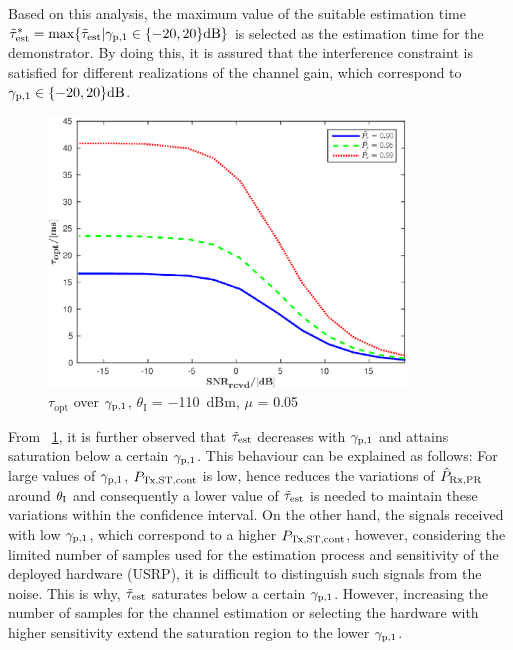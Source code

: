 Based on this analysis, the maximum value of the suitable estimation time $\tilde{\tau}^*_{\text{est}} = \operatorname*{max}\{ \tilde{\tau}_{\text{est}} | {\gamma}_{\text{p,1}} \in \{-20,20 \}\SI{}{dB} \}$ is selected as the estimation time for the demonstrator.  
By doing this, it is assured that the interference constraint is satisfied for different realizations of the channel gain, which correspond to ${\gamma}_{\text{p,1}} \in \{-20,20\}\SI{}{dB}$. 
\begin{figure}
	\centering
	\includegraphics[width=0.85\textwidth]{figures/tau_snr}
	\caption{$\tau_\textrm{opt}$ over ${\gamma}_{\text{p,1}}$, $\theta_\textrm{I}$ = \SI{-110}{dBm}, $\mu$ = 0.05}
	\label{fig:Tausnr}
\end{figure}
From \figurename~\ref{fig:Tausnr}, it is further observed that $\tilde{\tau}_{\text{est}}$ decreases with ${\gamma}_{\text{p,1}}$ and attains saturation below a certain ${\gamma}_{\text{p,1}}$. %
This behaviour can be explained as follows: For large values of ${\gamma}_{\text{p,1}}$, $P_{\text{Tx,ST,cont}}$ is low, hence reduces the variations of $\hat{P}_{\text{Rx,PR}}$ around $\theta_{\text{I}}$ and consequently a lower value of $\tilde{\tau}_{\text{est}}$ is needed to maintain these variations within the confidence interval. On the other hand, the signals received with low ${\gamma}_{\text{p,1}}$, which correspond to a higher $P_{\text{Tx,ST,cont}}$, however, considering the limited number of samples used for the estimation process and sensitivity of the deployed hardware (USRP), it is difficult to distinguish such signals from the noise. This is why, $\tilde{\tau}_{\text{est}}$ saturates below a certain ${\gamma}_{\text{p,1}}$. However, increasing the number of samples for the channel estimation or selecting the hardware with higher sensitivity extend the saturation region to the lower ${\gamma}_{\text{p,1}}$. 

